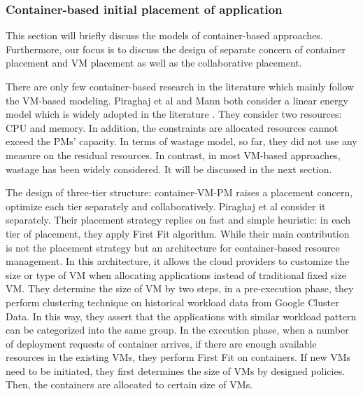 \subsubsection{Container-based initial placement of application}
\label{container-based-placement}

This section will briefly discuss the models of container-based approaches. Furthermore, our focus is to discuss the design of separate concern of container placement and VM placement as well as the collaborative placement. 

There are only few container-based research in the literature which mainly follow the VM-based modeling. Piraghaj et al \cite{Piraghaj:2016bw} and Mann \cite{Mann:2016hx} both consider a linear energy model which is widely adopted in the literature \cite{Xavier:2017jl}. They consider two resources: CPU and memory. In addition, the constraints are allocated resources cannot exceed the PMs' capacity. In terms of wastage model, so far, they did not use any measure on the residual resources. In contrast, in most VM-based approaches, wastage has been widely considered. It will be discussed in the next section.  

The design of three-tier structure: container-VM-PM raises a placement concern, optimize each tier separately and collaboratively.
Piraghaj et al \cite{Piraghaj:2016bw} consider it separately. Their placement strategy replies on fast and simple heuristic: in each tier of placement, they apply First Fit algorithm. While their main contribution is not the placement strategy but an architecture for container-based resource management. In this architecture, it allows the cloud providers to customize the size or type of VM when allocating applications instead of traditional fixed size VM. They determine the size of VM by two steps, in a pre-execution phase, they perform clustering technique on historical workload data from Google Cluster Data. In this way, they assert that the applications with similar workload pattern can be categorized into the same group. In the execution phase, when a number of deployment requests of container arrives, if there are enough available resources in the existing VMs, they perform First Fit on containers. If new VMs need to be initiated, they first determines the size of VMs by designed policies. Then, the containers are allocated to certain size of VMs. 

